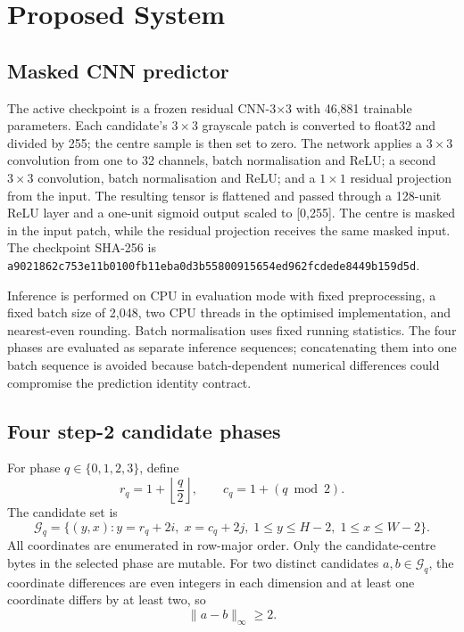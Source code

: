 \documentclass[preprint,12pt,a4paper]{elsarticle}
\begin{document}
\section{Proposed System}
\label{sec:method}



\subsection{Masked CNN predictor}

The active checkpoint is a frozen residual CNN-3$\times$3 with 46,881 trainable parameters. Each candidate's $3\times3$ grayscale patch is converted to float32 and divided by 255; the centre sample is then set to zero. The network applies a $3\times3$ convolution from one to 32 channels, batch normalisation and ReLU; a second $3\times3$ convolution, batch normalisation and ReLU; and a $1\times1$ residual projection from the input. The resulting tensor is flattened and passed through a 128-unit ReLU layer and a one-unit sigmoid output scaled to [0,255]. The centre is masked in the input patch, while the residual projection receives the same masked input. The checkpoint SHA-256 is \texttt{a9021862c753e11b0100fb11eba0d3b55800915654ed962fcdede8449b159d5d}.

Inference is performed on CPU in evaluation mode with fixed preprocessing, a fixed batch size of 2,048, two CPU threads in the optimised implementation, and nearest-even rounding. Batch normalisation uses fixed running statistics. The four phases are evaluated as separate inference sequences; concatenating them into one batch sequence is avoided because batch-dependent numerical differences could compromise the prediction identity contract.

\subsection{Four step-2 candidate phases}

For phase $q\in\{0,1,2,3\}$, define
\begin{equation}
r_q=1+\left\lfloor\frac{q}{2}\right\rfloor,\qquad
c_q=1+(q\bmod2).
\end{equation}
The candidate set is
\begin{equation}
\mathcal{G}_q=
\{(y,x): y=r_q+2i,\;x=c_q+2j,\;
1\le y\le H-2,\;1\le x\le W-2\}.
\label{eq:grid}
\end{equation}
All coordinates are enumerated in row-major order. Only the candidate-centre bytes in the selected phase are mutable. For two distinct candidates $a,b\in\mathcal{G}_q$, the coordinate differences are even integers in each dimension and at least one coordinate differs by at least two, so
\begin{equation}
\|a-b\|_\infty\ge2.
\label{eq:separation}
\end{equation}
\end{document}

